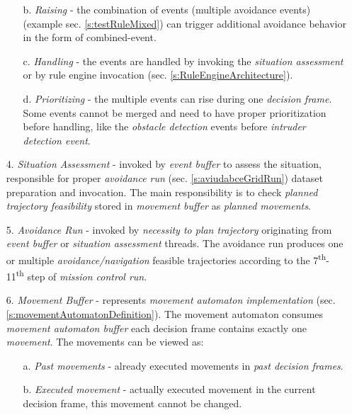 \begin{itemize}
\begin{itemize}
        \item[b.] \emph{Raising} - the combination of events (multiple avoidance events) (example sec. \ref{s:testRuleMixed}) can trigger additional avoidance behavior in the form of combined-event.
        
        \item[c.] \emph{Handling} - the events are handled by invoking the \emph{situation assessment} or by rule engine invocation (sec. \ref{s:RuleEngineArchitecture}).
        
        \item[d.] \emph{Prioritizing} - the multiple events can rise during one \emph{decision frame}. Some events cannot be merged and need to have proper prioritization before handling, like the \emph{obstacle detection} events before \emph{intruder detection event}.
    \end{itemize}
    
    \item[4.] \emph{Situation Assessment} - invoked by \emph{event buffer} to assess the situation, responsible for proper \emph{avoidance run} (sec. \ref{s:aviudabceGridRun}) dataset preparation and invocation. The main responsibility is to check \emph{planned trajectory feasibility} stored in \emph{movement buffer} as \emph{planned movements}.
    
    \item[5.] \emph{Avoidance Run} - invoked by \emph{necessity to plan trajectory} originating from \emph{event buffer} or \emph{situation assessment} threads. The avoidance run produces one or multiple \emph{avoidance/navigation} feasible trajectories according to  the 7\textsuperscript{th}-11\textsuperscript{th} step of \emph{mission control run}.
    
    \item[6.] \emph{Movement Buffer} - represents \emph{movement automaton implementation} (sec. \ref{s:movementAutomatonDefinition}). The movement automaton consumes \emph{movement automaton buffer} each decision frame contains exactly one \emph{movement}. The movements can be viewed as:
    \begin{itemize}
        \item[a.] \emph{Past movements} - already executed movements in \emph{past decision frames}.
        
        \item[b.] \emph{Executed movement} - actually executed movement in the current decision frame, this movement cannot be changed.
        

\end{itemize}
\end{itemize}
